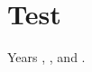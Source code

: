 \documentclass{article}
\begin{document}
\section{Test}\label{sec:test}
Years \citeyearpar{k1}, \citeyearpar[p.~4]{k2}, and \citeyearpar[see][p.~5]{k3, k4}.


\end{document}
